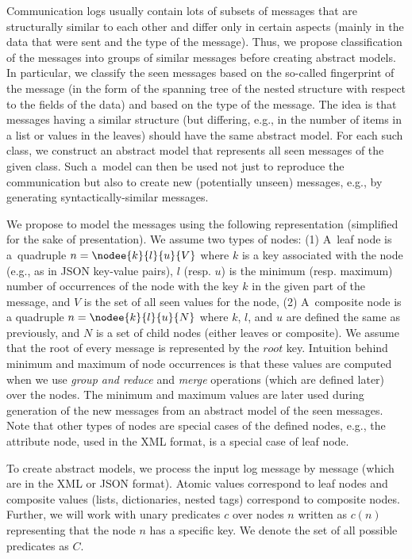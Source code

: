 {Communication logs usually contain lots of subsets of messages that are
structurally similar to each other and differ only in certain aspects (mainly
in the data that were sent and the type of the message). Thus, we propose
classification of the messages into groups of similar messages before creating
abstract models.
%
In particular, we classify the seen messages based on the so-called fingerprint
of the message (in the form of the spanning tree of the nested structure with respect to
the fields of the data) and based on the type of the message.
%
The idea is that messages having a similar structure (but differing, e.g., in the
number of items in a list or values in the leaves) should have the same abstract
model.
%
For each such class, we construct an abstract model that represents all seen
messages of the given class.
%
Such a~model can then be used not just to reproduce the communication but also
to create new (potentially unseen) messages, e.g., by generating
syntactically-similar messages. 

We propose to model the messages using the following representation (simplified
for the sake of presentation).
%
%
We assume two types of nodes: (1) A~leaf node is a~quadruple $n =
\nodee{k}{l}{u}{V}$ where $k$ is a key associated with the node (e.g., as in
JSON key-value pairs), $l$ (resp. $u$) is the minimum (resp. maximum) number of
occurrences of the node with the key $k$ in the given part of the message, and $V$ is the set of all
seen values for the node, (2) A~composite node is a quadruple $n =
\nodee{k}{l}{u}{N}$ where $k$, $l$, and $u$ are defined the same as previously,
and $N$ is a set of child nodes (either leaves or composite).
%
We assume that the root of every message is represented by the
$root$ key.
%
Intuition behind minimum and maximum of node occurrences is that these values are
computed when we use \emph{group and reduce} and \emph{merge} operations (which are defined later)
over the nodes.
The minimum and maximum values are later used during generation of the new messages from an
abstract model of the seen messages.
%
Note that other types of nodes are special cases of the defined nodes, e.g., the attribute node, used
in the XML format, is a special case of leaf node.

To create abstract models, we process the input log message by message (which are in
the XML or JSON format). 
%
Atomic values correspond to leaf nodes and composite values (lists,
dictionaries, nested tags) correspond to composite nodes.
%
Further, we will work with unary predicates $c$ over nodes $n$ written as $c(n)$
representing that the node $n$ has a specific key. We denote the set of
all possible predicates as $C$.

}
